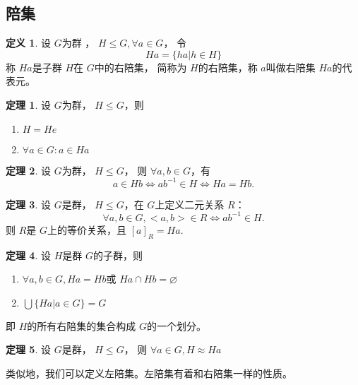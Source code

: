 \documentclass[a4paper,11pt]{article}%
\theoremstyle{remark}
\theoremstyle{remark}
\theoremstyle{definition}
\newtheorem{theorem}{定理}[section]
\theoremstyle{definition}
\newtheorem*{definition}{定义}
\theoremstyle{plain}
\begin{document}
\subsection{陪集}
\begin{definition}
    设 $G$为群 ， $H\leq G,\forall a\in G$， 令 
    \[Ha=\{ha|h\in H\}\]
    称 $Ha$是子群 $H$在 $G$中的右陪集， 简称为 $H$的右陪集，称 $a$叫做右陪集  $Ha$的代表元。
\end{definition}
\begin{theorem}
    设 $G$为群， $H\leq G$，则 
    \begin{enumerate}
        \item  $H=He$
        \item $\forall a\in G:a\in Ha$
    \end{enumerate}
\end{theorem}
\begin{theorem}
    设 $G$为群， $H\leq G$， 则 $\forall a,b \in G$，有 
    \[a\in Hb\Leftrightarrow ab^{-1}\in H\Leftrightarrow Ha=Hb.\]
\end{theorem}
\begin{theorem}
    设 $G$是群， $H\leq G$，在 $G$上定义二元关系 $R$：
    \[\forall a,b\in G,<a,b>\in R\Leftrightarrow ab^{-1}\in H.\]
    则 $R $是 $G$上的等价关系，且 $[a]_{R}=Ha.$
\end{theorem}
\begin{theorem}
    设 $H$是群 $G$的子群，则 
    \begin{enumerate}
        \item  $\forall a,b\in G,Ha=Hb$或 $Ha\cap Hb=\varnothing$
        \item $\bigcup\{Ha|a\in G\}=G$
    \end{enumerate}
    即 $H$的所有右陪集的集合构成 $G$的一个划分。
\end{theorem}
\begin{theorem}
    设 $G$是群，  $H\leq G$， 则 $\forall a\in G,H\approx Ha$
\end{theorem}
类似地，我们可以定义左陪集。左陪集有着和右陪集一样的性质。
\end{document}
